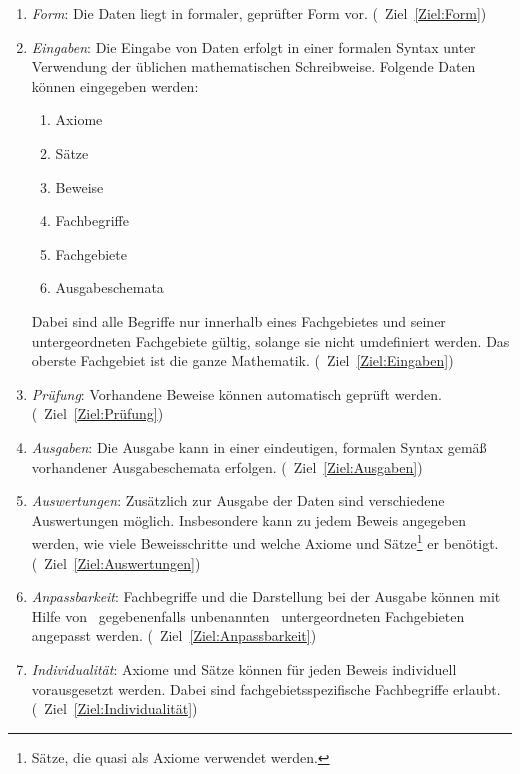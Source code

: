 \documentclass[english,ngerman,parskip=half,headsepline,footsepline]{scrreprt}
\begin{document}
	\begin{enumerate}

		\item \label{Anforderung:Form} \emph{Form}: Die Daten liegt in formaler, geprüfter Form vor. (\seename\ Ziel~\vref{Ziel:Form})

		\item \label{Anforderung:Eingaben} \emph{Eingaben}: Die Eingabe von Daten erfolgt in einer formalen Syntax unter Verwendung der üblichen mathematischen Schreibweise. Folgende Daten können eingegeben werden:
		\begin{enumerate}
			\item Axiome
			\item Sätze
			\item Beweise
			\item Fachbegriffe
			\item Fachgebiete
			\item Ausgabeschemata
		\end{enumerate}
		Dabei sind alle Begriffe nur innerhalb eines Fachgebietes und seiner untergeordneten Fachgebiete gültig, solange sie nicht umdefiniert werden. Das oberste Fachgebiet ist die ganze Mathematik. (\seename\ Ziel~\vref{Ziel:Eingaben})

		\item \label{Anforderung:Prüfung} \emph{Prüfung}: Vorhandene Beweise können automatisch geprüft werden. (\seename\ Ziel~\vref{Ziel:Prüfung})

		\item \label{Anforderung:Ausgaben} \emph{Ausgaben}: Die Ausgabe kann in einer eindeutigen, formalen Syntax gemäß vorhandener Ausgabeschemata erfolgen. (\seename\ Ziel~\vref{Ziel:Ausgaben})

		\item \label{Anforderung:Auswertungen} \emph{Auswertungen}: Zusätzlich zur Ausgabe der Daten sind verschiedene Auswertungen möglich. Insbesondere kann zu jedem Beweis angegeben werden, wie viele Beweisschritte und welche Axiome und Sätze\footnote{Sätze, die quasi als Axiome verwendet werden.} er benötigt. (\seename\ Ziel~\vref{Ziel:Auswertungen})

		\item \label{Anforderung:Anpassbarkeit} \emph{Anpassbarkeit}: Fachbegriffe und die Darstellung bei der Ausgabe können mit Hilfe von \textendash\ gegebenenfalls unbenannten \textendash\ untergeordneten Fachgebieten angepasst werden. (\seename\ Ziel~\vref{Ziel:Anpassbarkeit})

		\item \label{Anforderung:Individualität} \emph{Individualität}: Axiome und Sätze können für jeden Beweis individuell vorausgesetzt werden. Dabei sind fachgebietsspezifische Fachbegriffe erlaubt. (\seename\ Ziel~\vref{Ziel:Individualität})


\end{enumerate}
\end{document}
